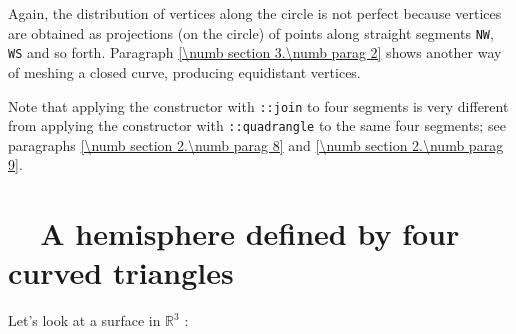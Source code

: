 Again, the distribution of vertices along the circle is not perfect
because vertices are obtained as projections (on the circle) of points
along straight segments {\small\tt NW}, {\small\tt WS} and so forth.
Paragraph \ref{\numb section 3.\numb parag 2} shows another way of meshing a closed curve,
producing equidistant vertices.

Note that applying the {\small\tt {}} constructor with {\small\tt {}::join}
to four segments is very different from applying the {\small\tt {}} constructor with
{\small\tt {}::quadrangle} to the same four segments;
see paragraphs \ref{\numb section 2.\numb parag 8} and \ref{\numb section 2.\numb parag 9}.


\section{~~A hemisphere defined by four curved triangles}\label{\numb section 2.\numb parag 5}

Let's look at a surface in $ \mathbb{R}^3 $ :

